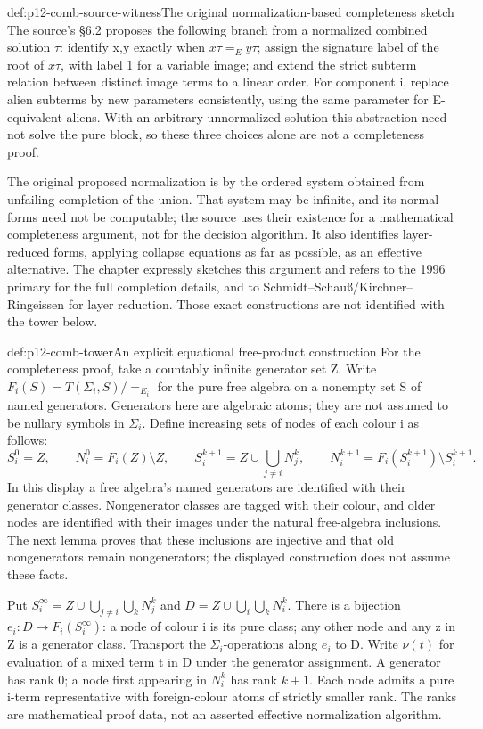 \begin{hbmethod}{def:p12-comb-source-witness}{The original normalization-based completeness sketch}
The source's \S6.2 proposes the following branch from a normalized
combined solution \(\tau\): identify x,y exactly when
\(x\tau=_Ey\tau\); assign the signature label of the root of
\(x\tau\), with label 1 for a variable image; and extend the strict
subterm relation between distinct image terms to a linear order.
For component i, replace alien subterms by new parameters consistently,
using the same parameter for E-equivalent aliens. With an arbitrary
unnormalized solution this abstraction need not solve the pure block,
so these three choices alone are not a completeness proof.

The original proposed normalization is by the ordered system obtained
from unfailing completion of the union. That system may be infinite,
and its normal forms need not be computable; the source uses their
existence for a mathematical completeness argument, not for the
decision algorithm. It also identifies layer-reduced forms, applying
collapse equations as far as possible, as an effective alternative.
The chapter expressly sketches this argument and refers to the
1996 primary for the full completion details, and to
Schmidt--Schau\ss/Kirchner--Ringeissen for layer reduction.
Those exact constructions are not identified with the tower below.
\cite[pp.~518--519]{BaaderSnyder2001}
\end{hbmethod}

\begin{hbdefinition}{def:p12-comb-tower}{An explicit equational free-product construction}
For the completeness proof, take a countably infinite generator set Z.
Write \(F_i(S)=T(\Sigma_i,S)/{=_{E_i}}\) for the pure free algebra on
a nonempty set S of named generators. Generators here are algebraic
atoms; they are not assumed to be nullary symbols in \(\Sigma_i\).
Define increasing sets of nodes of each colour i as follows:
\[
 S_i^0=Z,\qquad
 N_i^0=F_i(Z)\setminus Z,\qquad
 S_i^{k+1}=Z\cup\bigcup_{j\ne i}N_j^k,\qquad
 N_i^{k+1}=F_i(S_i^{k+1})\setminus S_i^{k+1}.
\]
In this display a free algebra's named generators are identified with
their generator classes. Nongenerator classes are tagged with their
colour, and older nodes are identified with their images under the
natural free-algebra inclusions. The next lemma proves that these
inclusions are injective and that old nongenerators remain nongenerators;
the displayed construction does not assume these facts.

Put \(S_i^\infty=Z\cup\bigcup_{j\ne i}\bigcup_kN_j^k\) and
\(D=Z\cup\bigcup_i\bigcup_kN_i^k\). There is a bijection
\(e_i:D\longrightarrow F_i(S_i^\infty)\): a node of colour i is
its pure class; any other node and any z in Z is a generator class.
Transport the \(\Sigma_i\)-operations along \(e_i\) to D.
Write \(\nu(t)\) for evaluation of a mixed term t in D under the
generator assignment. A generator has rank 0; a node first appearing
in \(N_i^k\) has rank \(k+1\). Each node admits a pure i-term
representative with foreign-colour atoms of strictly smaller rank.
The ranks are mathematical proof data, not an asserted effective
normalization algorithm.
\end{hbdefinition}


